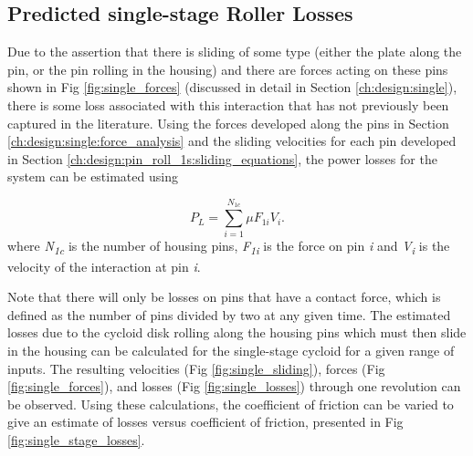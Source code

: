 \subsection{Predicted single-stage Roller Losses} \label{ch:design:pin_roll_1s:predicted_losses}

Due to the assertion that there is sliding of some type (either the plate along the pin, or the pin rolling in the housing) and there are forces acting on these pins shown in Fig \ref{fig:single_forces} (discussed in detail in Section \ref{ch:design:single}), there is some loss associated with this interaction that has not previously been captured in the literature. Using the forces developed along the pins in Section \ref{ch:design:single:force_analysis} and the sliding velocities for each pin developed in Section \ref{ch:design:pin_roll_1s:sliding_equations}, the power losses for the system can be estimated using 

\begin{equation} \label{eq:single_power_loss}
P_L = \sum_{i=1}^{N_{1c}}\mu F_{1i} V_i.
\end{equation}
where \textit{N\textsubscript{1c}} is the number of housing pins, \textit{F\textsubscript{1i}} is the force on pin \textit{i} and \textit{V\textsubscript{i}} is the velocity of the interaction at pin \textit{i}.

Note that there will only be losses on pins that have a contact force, which is defined as the number of pins divided by two at any given time. The estimated losses due to the cycloid disk rolling along the housing pins which must then slide in the housing can be calculated for the single-stage cycloid for a given range of inputs. The resulting velocities (Fig \ref{fig:single_sliding}), forces (Fig \ref{fig:single_forces}), and losses (Fig \ref{fig:single_losses}) through one revolution can be observed. Using these calculations, the coefficient of friction can be varied to give an estimate of losses versus coefficient of friction, presented in Fig \ref{fig:single_stage_losses}.

